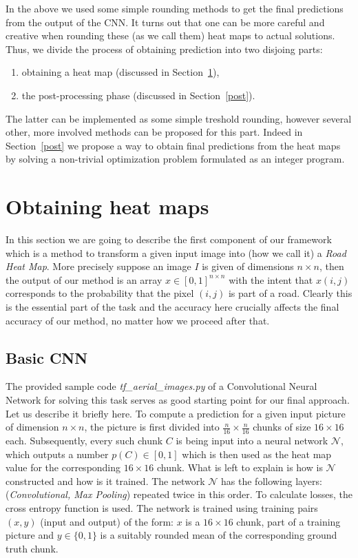 \documentclass[10pt,conference,compsocconf]{IEEEtran}
\newcommand{\cN}{\mathcal{N}}
\begin{document}
In the above we used some simple rounding methods to get the final predictions from the output of the CNN. It turns out that one can be more careful and creative when rounding these (as we call them) heat maps to actual solutions. Thus, we divide the process of obtaining prediction into two disjoing parts:
\begin{enumerate}
\item obtaining a heat map (discussed in Section~\ref{model}),
\item the post-processing phase (discussed in Section~\ref{post}).
\end{enumerate}
The latter can be implemented as some simple treshold rounding, however several other, more involved methods can be proposed for this part. Indeed in Section~\ref{post} we propose a way to obtain final predictions from the heat maps by solving a non-trivial optimization problem formulated as an integer program. 





  
\section{Obtaining heat maps}\label{model}
In this section we are going to describe the first component of our framework which is a method to transform a given input image into (how we call it) a {\it Road Heat Map}. More precisely suppose an image $I$ is given of dimensions $n\times n$, then the output of our method is an array $x\in [0,1]^{n\times n}$ with the intent that $x(i,j)$ corresponds to the probability that the pixel $(i,j)$ is part of a road. Clearly this is the essential part of the task and the accuracy here crucially affects the final accuracy of our method, no matter how we proceed after that. 

\subsection{Basic CNN}\label{basic}
The provided sample code {\it tf\_aerial\_images.py} of a Convolutional Neural Network for solving this task serves as good starting point for our final approach. Let us describe it briefly here. To compute a prediction for a given input picture of dimension $n\times n$, the picture is first divided into $\frac{n}{16} \times \frac{n}{16}$ chunks of size $16 \times 16$ each. Subsequently, every such chunk $C$ is being input into a neural network $\cN$, which outputs a number $p(C) \in [0,1]$ which is then used as the heat map value for the corresponding $16\times 16$ chunk. What is left to explain is how is $\cN$ constructed and how is it trained. The network $\cN$ has the following layers: (\textit{Convolutional, Max Pooling}) repeated twice in this order. To calculate  losses, the cross entropy function is used. The network  is trained using training pairs $(x,y)$ (input and output) of the form: $x$ is a $16\times 16$ chunk, part of a training picture and $y \in \{0,1\}$ is a suitably rounded mean of the corresponding ground truth chunk.  
\end{document}
